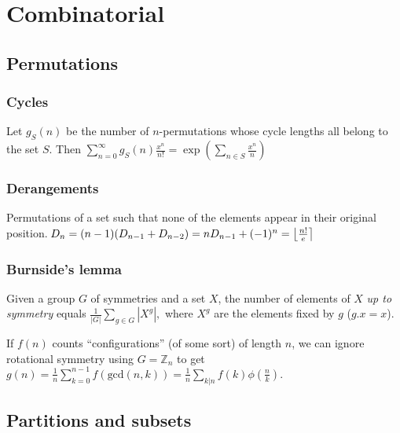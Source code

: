 \chapter{Combinatorial}

\section{Permutations}
	\subsection{Cycles}
		Let $g_S(n)$ be the number of $n$-permutations whose cycle lengths all belong to the set $S$. Then
    $\sum_{n=0} ^\infty g_S(n) \frac{x^n}{n!} = \exp\left(\sum_{n\in S} \frac{x^n} {n} \right)$

	\subsection{Derangements}
		Permutations of a set such that none of the elements appear in their original position.
		$ \mkern-2mu D_{n} = (n-1)(D_{n-1}+D_{n-2}) = n D_{n-1}+(-1)^n = \left\lfloor\frac{n!}{e}\right\rceil $

	\subsection{Burnside's lemma}
		Given a group $G$ of symmetries and a set $X$, the number of elements of $X$ \emph{up to symmetry} equals
		 $ {\frac {1}{|G|}}\sum _{{g\in G}}|X^{g}|, $
		 where $X^{g}$ are the elements fixed by $g$ ($g.x = x$).

		 If $f(n)$ counts ``configurations'' (of some sort) of length $n$, we can ignore rotational symmetry using $G = \mathbb Z_n$ to get
		 $ g(n) = \frac 1 n \sum_{k=0}^{n-1}{f(\text{gcd}(n, k))} = \frac 1 n \sum_{k|n}{f(k)\phi(\frac{n}{k})}. $

\section{Partitions and subsets}

